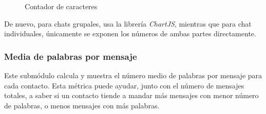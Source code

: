 \begin{figure}[H]
	\centering
	\qquad
	\caption{Contador de caracteres}
	\label{fig:chap4:char_count}
\end{figure}

De nuevo, para chats grupales, usa la librería \textit{ChartJS}, mientras que para chat individuales, únicamente se exponen los números de ambas partes directamente.

\subsubsection{Media de palabras por mensaje}

Este submódulo calcula y muestra el número medio de palabras por mensaje para cada contacto. Esta métrica puede ayudar, junto con el número de mensajes totales, a saber si un contacto tiende a mandar más mensajes con menor número de palabras, o menos mensajes con más palabras.

